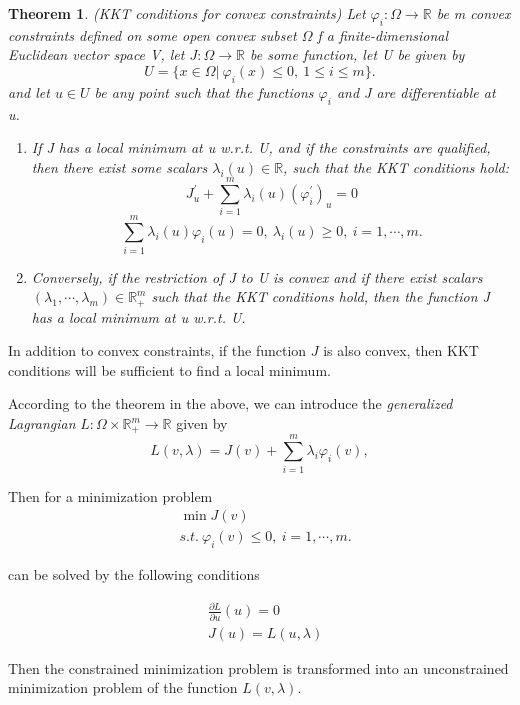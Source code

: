 \documentclass[a4paper]{report}
\newtheorem{theorem}{Theorem}[section]
\begin{document}
\begin{theorem}
    (KKT conditions for convex constraints) Let $\varphi_i:\Omega\to \mathbb R$ be m convex constraints defined on some open convex subset $\Omega$ f a finite-dimensional Euclidean vector space V, let $J:\Omega\to\mathbb R$ be some function, let U be given by
    \[
        U=\{x\in\Omega|\ \varphi_i(x)\leq0, \ 1\leq i\leq m\}.
    \]
    and let $u\in U$ be any point such that the functions $\varphi_i$ and J are differentiable at u.
    \begin{enumerate}[label={(\arabic*)}]
        \item If J has a local minimum at u w.r.t. U, and if the constraints are qualified, then there exist some scalars $\lambda_i(u)\in\mathbb R$, such that the KKT conditions hold:
            \[
                J^\prime_u+\sum_{i=1}^m\lambda_i(u)(\varphi^\prime_i)_u=0
            \]
            \[
                \sum_{i=1}^m\lambda_i(u)\varphi_i(u)=0,\ \lambda_i(u)\geq 0,\ i=1,\cdots,m.
            \]
        \item Conversely, if the restriction of J to U is convex and if there exist scalars $(\lambda_1,\cdots,\lambda_m)\in\mathbb R_+^m$ such that the KKT conditions hold, then the function J has a local minimum at u w.r.t. U.
    \end{enumerate}
\end{theorem}

In addition to convex constraints, if the function $J$ is also convex, then KKT conditions will be sufficient to find a local minimum.

According to the theorem in the above, we can introduce the \emph{generalized Lagrangian} $L:\Omega\times\mathbb R^m_+\to \mathbb R$ given by
\[
    L(v,\lambda)=J(v)+\sum_{i=1}^m\lambda_i\varphi_i(v),
\]

Then for a minimization problem
\begin{align*}
    &\min J(v) \\
    &s.t.\ \varphi_i(v)\leq 0,\ i=1,\cdots,m.
\end{align*}

can be solved by the following conditions

\begin{align}
    &\frac{\partial L}{\partial u}(u)=0 \label{kktderi}\\
    &J(u)=L(u,\lambda)
\end{align}

Then the constrained minimization problem is transformed into an unconstrained minimization problem of the function $L(v,\lambda)$.
\end{document}
